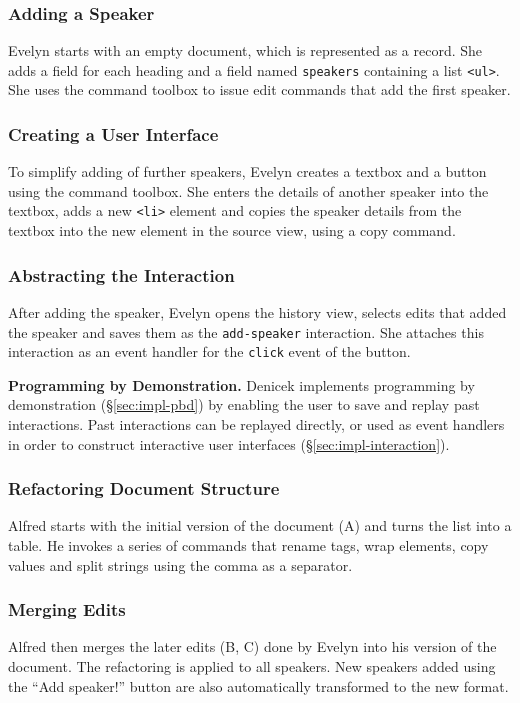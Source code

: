 \documentclass[sigconf]{acmart}
\newcommand{\diff}[1]{{#1}}
\newcommand{\note}[1]{}
\newcommand*\circled[1]{\textnormal{\footnotesize\sffamily\bfseries\protect\tikz[baseline=(char.base)]{
  \node[shape=circle,fill=black,text=white,draw,inner sep=1pt] (char) {#1};}}}
\DeclareRobustCommand{\keyideabox}[3]
{\vspace{\dimexpr\baselineskip\relax} \noindent\colorbox{gray!20}{
\parbox{\dimexpr\columnwidth-\marginparsep+1pt\relax}
{\small {#1} \textbf{#2.} #3}
}}
\begin{document}
\subsubsection*{\circled{A} Adding a Speaker}
Evelyn starts with an empty document, which is represented as a record. She adds a field for
each heading and a field named {\small\texttt{speakers}}
containing a list {\small\texttt{<ul>}}. \diff{She
uses the command toolbox to issue edit commands that add the first speaker.}

\subsubsection*{\circled{B} Creating a User Interface} To simplify adding of
further speakers, Evelyn creates a textbox and a button \diff{using the command toolbox}. She enters
the details of another speaker \diff{into the textbox}, adds a new {\small\texttt{<li>}} element
and copies the speaker details from the textbox into the new element in the source view,
\diff{using a copy command}.

\subsubsection*{\circled{C} Abstracting the Interaction} After adding the speaker,
Evelyn opens the history view, selects edits that added the speaker and saves them as the
{\small\texttt{add-speaker}} interaction. She attaches this interaction as an event handler for the
{\small\texttt{click}} event of the button.

\keyideabox{\faLightbulbO}{Programming by Demonstration}{Denicek implements programming by
demonstration (\S\ref{sec:impl-pbd}) by enabling the user to save and replay past interactions.
Past interactions can be replayed directly, or used as event handlers in order to construct interactive user
interfaces (\S\ref{sec:impl-interaction}).}


\subsubsection*{\circled{D} Refactoring Document Structure} Alfred starts with the initial
version of the document (A) and turns the list into a table. He invokes a series of commands that
\diff{rename tags, wrap elements, copy values and split strings using the comma as a separator}.
\note{More concrete description of edits}

\subsubsection*{\circled{E} Merging Edits}
\diff{Alfred then merges the later edits (B, C) done by Evelyn into his version of the document.}
The refactoring is applied to all speakers. New speakers added using the ``Add speaker!''
button are also automatically transformed to the new format.
\end{document}
